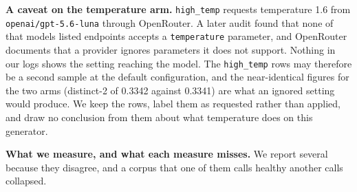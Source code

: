 \documentclass[
  10pt,
]{article}
\theoremstyle{plain}
\theoremstyle{definition}
\begin{document}
\textbf{A caveat on the temperature arm.} \texttt{high\_temp} requests
temperature 1.6 from \texttt{openai/gpt-5.6-luna} through OpenRouter. A
later audit found that none of that model\textquotesingle s listed
endpoints accepts a \texttt{temperature} parameter, and OpenRouter
documents that a provider ignores parameters it does not support.
Nothing in our logs shows the setting reaching the model. The
\texttt{high\_temp} rows may therefore be a second sample at the default
configuration, and the near-identical figures for the two arms
(distinct-2 of 0.3342 against 0.3341) are what an ignored setting would
produce. We keep the rows, label them as requested rather than applied,
and draw no conclusion from them about what temperature does on this
generator.

\textbf{What we measure, and what each measure misses.} We report
several because they disagree, and a corpus that one of them calls
healthy another calls collapsed.
\end{document}
